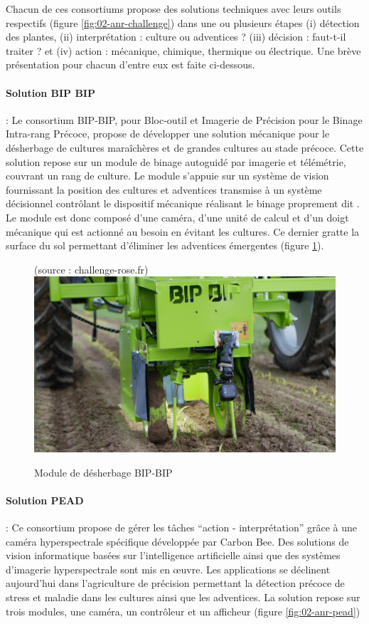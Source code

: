 \documentclass[../thesis.tex]{subfiles}
\begin{document}
    Chacun de ces consortiums propose des solutions techniques avec leurs outils respectifs (figure \ref{fig:02-anr-challenge}) dans une ou plusieurs étapes (i) détection des plantes, (ii) interprétation : culture ou adventices ? (iii) décision : faut-t-il traiter ? et (iv) action : mécanique, chimique, thermique ou électrique. Une brève présentation pour chacun d'entre eux est faite ci-dessous.
    
    \paragraph{Solution BIP BIP} : Le consortium BIP-BIP, pour Bloc-outil et Imagerie de Précision pour le Binage Intra-rang Précoce, propose \og de développer une solution mécanique pour le désherbage de cultures maraîchères et de grandes cultures au stade précoce. Cette solution repose sur un module de binage autoguidé par imagerie et télémétrie, couvrant un rang de culture. Le module s'appuie sur un système de vision fournissant la position des cultures et adventices transmise à un système décisionnel contrôlant le dispositif mécanique réalisant le binage proprement dit \fg. Le module est donc composé d'une caméra, d'une unité de calcul et d'un doigt mécanique qui est actionné au besoin en évitant les cultures. Ce dernier gratte la surface du sol permettant d'éliminer les adventices émergentes (figure \ref{fig:02-bip-bip}). %
    
    \begin{figure}[H]
        \centering
        {\scriptsize (source : challenge-rose.fr)} \\
        \includegraphics[width=0.6\linewidth]{img/intro/bip-bip}
        \caption{Module de désherbage BIP-BIP}
        \label{fig:02-bip-bip}
    \end{figure}
    
    \newpage
    \paragraph{Solution PEAD} :  Ce consortium propose de gérer les tâches ``action - interprétation'' grâce à une caméra hyperspectrale spécifique développée par Carbon Bee. Des solutions de vision informatique basées sur l'intelligence artificielle ainsi que des systèmes d'imagerie hyperspectrale sont mis en œuvre. Les applications se déclinent aujourd'hui dans l'agriculture de précision permettant la détection précoce de stress et maladie dans les cultures ainsi que les adventices. La solution repose sur trois modules, une caméra, un contrôleur et un afficheur (figure \ref{fig:02-anr-pead})
    
\end{document}

